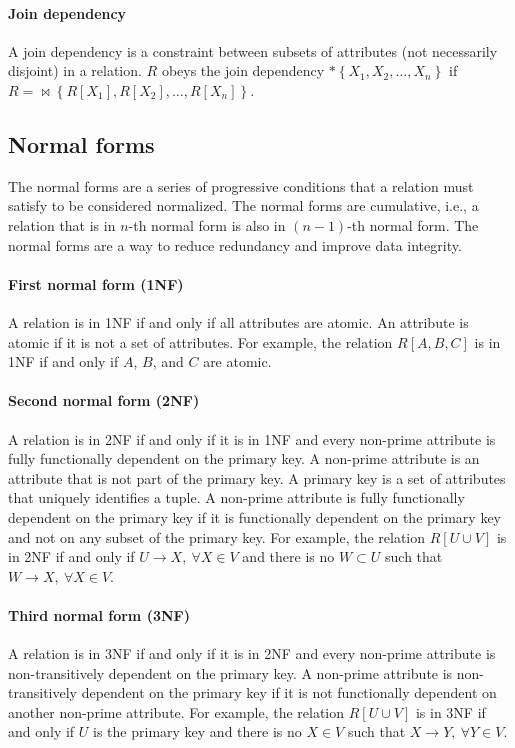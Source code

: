 \paragraph{Join dependency}  A join dependency is a constraint between subsets of
attributes (not necessarily disjoint) in a relation.  $R$ obeys the join dependency $*
\left\{ X_1, X_2, \dots, X_n \right\}$ if $R = {\bowtie \left\{ R[X_1], R[X_2], \dots,
R[X_n] \right\}}$.

\subsection{Normal forms}

The normal forms are a series of progressive conditions that a relation must satisfy to
be considered normalized.  The normal forms are cumulative, i.e., a relation that is in
$n$-th normal form is also in $(n-1)$-th normal form.  The normal forms are a way to
reduce redundancy and improve data integrity.

\paragraph{First normal form (1NF)}  A relation is in 1NF if and only if all attributes
are atomic.  An attribute is atomic if it is not a set of attributes.  For example, the
relation $R[A, B, C]$ is in 1NF if and only if $A$, $B$, and $C$ are atomic.

\paragraph{Second normal form (2NF)}  A relation is in 2NF if and only if it is in 1NF
and every non-prime attribute is fully functionally dependent on the primary key.  A
non-prime attribute is an attribute that is not part of the primary key.  A primary key
is a set of attributes that uniquely identifies a tuple.  A non-prime attribute is fully
functionally dependent on the primary key if it is functionally dependent on the primary
key and not on any subset of the primary key.  For example, the relation $R[U \cup V]$ is
in 2NF if and only if $U \to X,~\forall X \in V$ and there is no $W \subset U$ such that
$W \to X,~\forall X \in V$.

\paragraph{Third normal form (3NF)}  A relation is in 3NF if and only if it is in 2NF
and every non-prime attribute is non-transitively dependent on the primary key.  A
non-prime attribute is non-transitively dependent on the primary key if it is not
functionally dependent on another non-prime attribute.  For example, the relation $R[U
\cup V]$ is in 3NF if and only if $U$ is the primary key and there is no $X \in V$ such
that $X \to Y,~\forall Y \in V$.

